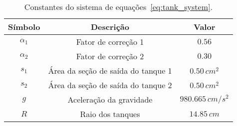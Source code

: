 \begin{table}[ht]
  \centering
  \caption{Constantes do sistema de equações~\ref{eq:tank_system}.}
  \label{tab:tanks_params}
  \begin{tabular}{ccc}
    Símbolo    & Descrição                          & Valor               \\ \hline
    $\alpha_1$ & Fator de correção 1                & $0.56$              \\
    $\alpha_2$ & Fator de correção 2                & $0.30$              \\
    $s_1$      & Área da seção de saída do tanque 1 & $0.50 \, cm^2$      \\
    $s_2$      & Área da seção de saída do tanque 2 & $0.50 \, cm^2$      \\
    $g$        & Aceleração da gravidade            & $980.665 \, cm/s^2$ \\
    $R$        & Raio dos tanques                   & $14.85 \, cm$       \\ \hline
  \end{tabular}
\end{table}